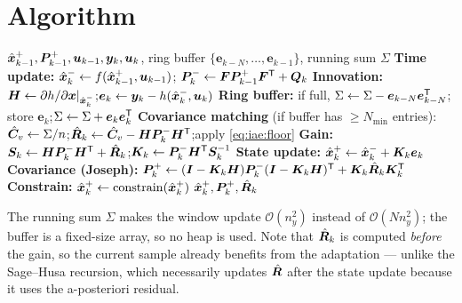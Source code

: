 \section{Algorithm}
\begin{algorithm}[H]
\caption{IAE-AKF --- one sampling period}
\begin{algorithmic}[1]
\Require $\hat{\bm{x}}^{+}_{k-1},\bm{P}^{+}_{k-1},\bm{u}_{k-1},\bm{y}_k,\bm{u}_k$, ring buffer $\{\bm{e}_{k-N},\dots,\bm{e}_{k-1}\}$, running sum $\Sigma$
\State \textbf{Time update:} $\hat{\bm{x}}^{-}_k\gets f(\hat{\bm{x}}^{+}_{k-1},\bm{u}_{k-1})$;\quad
       $\bm{P}^{-}_k\gets\bm{F}\bm{P}^{+}_{k-1}\bm{F}^{\mathsf{T}}+\bm{Q}_k$
\State \textbf{Innovation:} $\bm{H}\gets\partial h/\partial\bm{x}|_{\hat{\bm{x}}^{-}_k}$;\quad $\bm{e}_k\gets\bm{y}_k-h(\hat{\bm{x}}^{-}_k,\bm{u}_k)$
\State \textbf{Ring buffer:} if full, $\Sigma\gets\Sigma-\bm{e}_{k-N}\bm{e}_{k-N}^{\mathsf{T}}$;\quad
       store $\bm{e}_k$;\quad $\Sigma\gets\Sigma+\bm{e}_k\bm{e}_k^{\mathsf{T}}$
\State \textbf{Covariance matching} (if buffer has $\ge N_{\min}$ entries):
       $\hat{\bm{C}}_v\gets\Sigma/n$;\quad $\hat{\bm{R}}_k\gets\hat{\bm{C}}_v-\bm{H}\bm{P}^{-}_k\bm{H}^{\mathsf{T}}$;\quad apply \eqref{eq:iae:floor}
\State \textbf{Gain:} $\bm{S}_k\gets\bm{H}\bm{P}^{-}_k\bm{H}^{\mathsf{T}}+\hat{\bm{R}}_k$;\quad $\bm{K}_k\gets\bm{P}^{-}_k\bm{H}^{\mathsf{T}}\bm{S}_k^{-1}$
\State \textbf{State update:} $\hat{\bm{x}}^{+}_k\gets\hat{\bm{x}}^{-}_k+\bm{K}_k\bm{e}_k$
\State \textbf{Covariance (Joseph):} $\bm{P}^{+}_k\gets(\bm{I}-\bm{K}_k\bm{H})\bm{P}^{-}_k(\bm{I}-\bm{K}_k\bm{H})^{\mathsf{T}}+\bm{K}_k\hat{\bm{R}}_k\bm{K}_k^{\mathsf{T}}$
\State \textbf{Constrain:} $\hat{\bm{x}}^{+}_k\gets\mathrm{constrain}(\hat{\bm{x}}^{+}_k)$
\Ensure $\hat{\bm{x}}^{+}_k,\bm{P}^{+}_k,\hat{\bm{R}}_k$
\end{algorithmic}
\end{algorithm}
The running sum $\Sigma$ makes the window update $\mathcal{O}(n_y^2)$ instead of
$\mathcal{O}(N n_y^2)$; the buffer is a fixed-size array, so no heap is used.  Note that
$\hat{\bm{R}}_k$ is computed \emph{before} the gain, so the current sample already benefits from the
adaptation --- unlike the Sage--Husa recursion, which necessarily updates $\hat{\bm{R}}$ after the
state update because it uses the a-posteriori residual.

